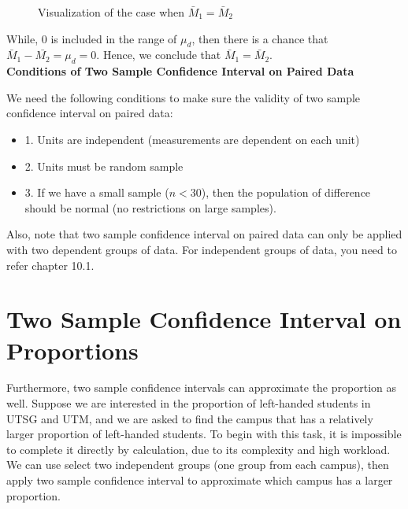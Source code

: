 \begin{figure}[H]
\begin{center}
\end{center}
\caption{Visualization of the case when $\bar{M}_1 = \bar{M}_2$}
\end{figure}

While, 0 is included in the range of $\mu_d$, then there is a chance that $\bar{M}_1 - \bar{M_2} = \mu_d = 0.$ Hence, we conclude that $\bar{M}_1 = \bar{M}_2$.\\

\textbf{Conditions of Two Sample Confidence Interval on Paired Data}

We need the following conditions to make sure the validity of two sample confidence interval on paired data:

\begin{itemize}
	\item 1. Units are independent (measurements are dependent on each unit)
	\item 2. Units must be random sample
	\item 3. If we have a small sample ($n < 30$), then the population of difference should be normal (no restrictions on large samples).
\end{itemize}

Also, note that two sample confidence interval on paired data can only be applied with two dependent groups of data. For independent groups of data, you need to refer chapter 10.1.

\section{Two Sample Confidence Interval on Proportions}

Furthermore, two sample confidence intervals can approximate the proportion as well. Suppose we are interested in the proportion of left-handed students in UTSG and UTM, and we are asked to find the campus that has a relatively larger proportion of left-handed students. To begin with this task, it is impossible to complete it directly by calculation, due to its complexity and high workload. We can use select two independent groups (one group from each campus), then apply two sample confidence interval to approximate which campus has a larger proportion.\\

